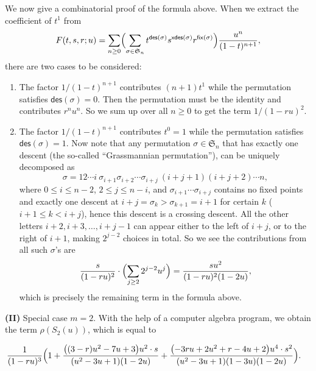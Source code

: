 \documentclass[12pt]{amsart}
\numberwithin{equation}{section}
\theoremstyle{plain}
\theoremstyle{definition}
\def\xdes{\mathsf{xdes}}
\def\fix{\mathsf{fix}}
\def\des{\mathsf{des}}
\def\S{\mathfrak{S}}
\begin{document}
We now give a combinatorial proof of the formula above. When we extract the coefficient of $t^1$ from \begin{equation*}
F(t,s,r; u)=\sum_{n\geq 0} \Bigl( \sum_{\sigma\in \S_n} 
	 t^{\des(\sigma)}  s^{\xdes(\sigma)} r^{\fix(\sigma)}\Bigr) \frac {u^n}{(1-t)^{n+1}},
\end{equation*} 
there are two cases to be considered:
\begin{enumerate}
	\item The factor $1/{(1-t)^{n+1}}$ contributes $(n+1)t^1$ while the permutation satisfies $\des(\sigma)=0$. Then the permutation must be the identity and contributes $r^nu^n$. So we sum up over all $n\ge 0$ to get the term $1/{(1-ru)^2}$.
	\item The factor $1/{(1-t)^{n+1}}$ contributes $t^0=1$ while the permutation satisfies $\des(\sigma)=1$. Now note that any permutation $\sigma\in\S_n$ that has exactly one descent (the so-called ``Grassmannian permutation''), can be uniquely decomposed as $$\sigma=12\cdots i~\sigma_{i+1}\sigma_{i+2}\cdots\sigma_{i+j}~(i+j+1)(i+j+2)\cdots n,$$
	where $0\le i \le n-2$, $2\le j\le n-i$, and $\sigma_{i+1}\cdots\sigma_{i+j}$ contains no fixed points and exactly one descent at $i+j=\sigma_{k}>\sigma_{k+1}=i+1$ for certain $k$ ($i+1\le k<i+j$), hence this descent is a crossing descent. All the other letters $i+2,i+3,\ldots,i+j-1$ can appear either to the left of $i+j$, or to the right of $i+1$, making $2^{j-2}$ choices in total. So we see the contributions from all such $\sigma$'s are
	$$\frac{s}{(1-ru)^2}\cdot \Bigl(\sum_{j\ge 2}2^{j-2}u^j\Bigr)=\frac{su^2}{(1-ru)^2(1-2u)},$$
	which is precisely the remaining term in the formula above.
\end{enumerate}
 
{\bf (II)} Special case $m=2$. With the help of a computer algebra program, we obtain the term $\rho(S_2(u))$, which is equal to

 \begin{align*}
 	&\frac{1}{(1-ru)^3}
 	\Bigl(	1 +
 	 \frac{{\left((3-r)  u^{2} - 7  u + 3\right)} u^{2}\cdot s}{{\left(u^{2} - 3  u + 1\right)} {\left(1- 2  u \right)}}
 	+
 	\frac{{\left(-3  r u + 2  u^{2} + r - 4  u + 2\right)}   u^{4}\cdot s^2}{{\left(u^{2} - 3  u + 1\right)} {\left(1-3  u \right)} {\left(1-2  u \right)}}
 	\Bigr).
 	
 \end{align*}
 
\end{document}
